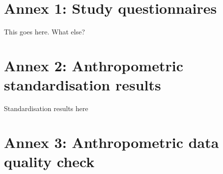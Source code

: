 \documentclass[12pt,a4paper]{article}
\begin{document}
\hypertarget{annex-1-study-questionnaires}{%
\section*{Annex 1: Study questionnaires}\label{annex-1-study-questionnaires}}

This goes here. What else?

\newpage

\hypertarget{annex-2-anthropometric-standardisation-results}{%
\section*{Annex 2: Anthropometric standardisation results}\label{annex-2-anthropometric-standardisation-results}}

Standardisation results here

\newpage

\hypertarget{annex-3-anthropometric-data-quality-check}{%
\section*{Annex 3: Anthropometric data quality check}\label{annex-3-anthropometric-data-quality-check}}

\newpage

\renewcommand\refname{References}

\end{document}
